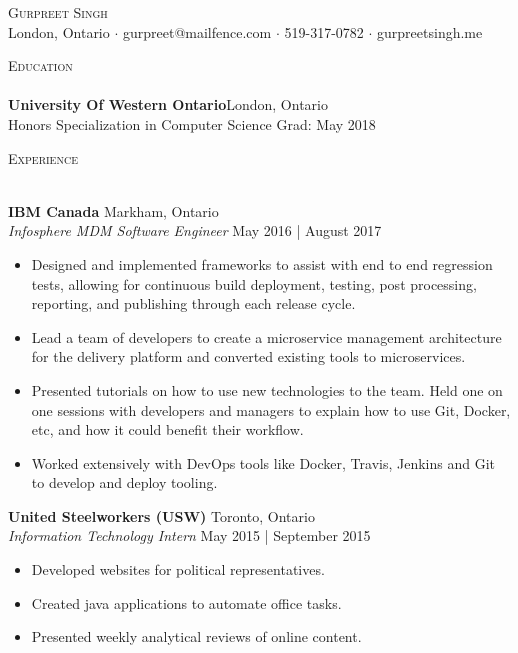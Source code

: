 \documentclass[a4paper]{article}
\newcommand{\lineunder} {
    \vspace*{-8pt} \\
    \hspace*{-18pt} \hrulefill \\
}
\newcommand{\header} [1] {
    {\hspace*{-18pt}\vspace*{6pt} \textsc{#1}}
    \vspace*{-6pt} \lineunder
}
\begin{document}
\vspace*{-40pt}

\vspace*{-10pt}
\begin{center}
	{\Huge \scshape {Gurpreet Singh}}\\
	London, Ontario $\cdot$ gurpreet@mailfence.com $\cdot$ 519-317-0782 $\cdot$ gurpreetsingh.me\\
\end{center}

\vspace*{2mm}

\header{Education}
\textbf{University Of Western Ontario}\hfill London, Ontario\\
Honors Specialization in Computer Science \hfill Grad: May 2018\\
\vspace{2mm}

\vspace*{2mm}

\header{Experience}
\vspace{1mm}

\textbf{IBM Canada} \hfill Markham, Ontario\\
\textit{Infosphere MDM Software Engineer} \hfill May 2016 | August 2017\\
\vspace{-1mm}
\begin{itemize} \itemsep 1pt
	\item Designed and implemented frameworks to assist with end to end regression tests, allowing for continuous build deployment, testing, post processing, reporting, and publishing through each release cycle.
	\item Lead a team of developers to create a microservice management architecture for the delivery platform and converted existing tools to microservices.
	\item Presented tutorials on how to use new technologies to the team. Held one on one sessions with developers and managers to explain how to use Git, Docker, etc, and how it could benefit their workflow.
	\item Worked extensively with DevOps tools like Docker, Travis, Jenkins and Git to develop and deploy tooling.
\end{itemize}

\textbf{United Steelworkers (USW)} \hfill Toronto, Ontario\\
\textit{Information Technology Intern} \hfill May 2015 | September 2015\\
\vspace{-1mm}
\begin{itemize} \itemsep 1pt
	\item Developed websites for political representatives.
	\item Created java applications to automate office tasks.
	\item Presented weekly analytical reviews of online content.
\end{itemize}
\end{document}
